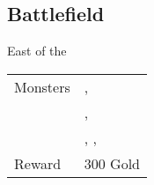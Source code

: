 \subsection{Battlefield}
\label{map:battlefield_05}

East of the 

\noindent\begin{tabularx}{\textwidth}[l]{lX}
	Monsters
	& \nameref{monster:mint_mint}, \nameref{monster:mint_mint} \\
	& \nameref{monster:giant_toad}, \nameref{monster:giant_toad} \\
	& \nameref{monster:giant_toad}, \nameref{monster:giant_toad}, \nameref{monster:mint_mint}
\\ \hline
	Reward & 300 Gold
\end{tabularx}
